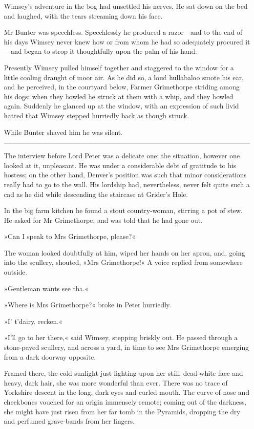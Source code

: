 Wimsey's adventure in the bog had unsettled his nerves. He sat down on the bed and laughed, with the tears streaming down his face.

Mr Bunter was speechless. Speechlessly he produced a razor—and to the end of his days Wimsey never knew how or from whom he had so adequately procured it—and began to strop it thoughtfully upon the palm of his hand.

Presently Wimsey pulled himself together and staggered to the window for a little cooling draught of moor air. As he did so, a loud hullabaloo smote his ear, and he perceived, in the courtyard below, Farmer Grimethorpe striding among his dogs; when they howled he struck at them with a whip, and they howled again. Suddenly he glanced up at the window, with an expression of such livid hatred that Wimsey stepped hurriedly back as though struck.

While Bunter shaved him he was silent. 

\noindent\hfil\rule{0.5\textwidth}{.4pt}\hfil 

The interview before Lord Peter was a delicate one; the situation, however one looked at it, unpleasant. He was under a considerable debt of gratitude to his hostess; on the other hand, Denver's position was such that minor considerations really had to go to the wall. His lordship had, nevertheless, never felt quite such a cad as he did while descending the staircase at Grider's Hole.

In the big farm kitchen he found a stout country-woman, stirring a pot of stew. He asked for Mr Grimethorpe, and was told that he had gone out.

»Can I speak to Mrs Grimethorpe, please?«

The woman looked doubtfully at him, wiped her hands on her apron, and, going into the scullery, shouted, »Mrs Grimethorpe!« A voice replied from somewhere outside.

»Gentleman wants see tha.«

»Where is Mrs Grimethorpe?« broke in Peter hurriedly.

»I' t'dairy, recken.«

»I'll go to her there,« said Wimsey, stepping briskly out. He passed through a stone-paved scullery, and across a yard, in time to see Mrs Grimethorpe emerging from a dark doorway opposite.

Framed there, the cold sunlight just lighting upon her still, dead-white face and heavy, dark hair, she was more wonderful than ever.  There was no trace of Yorkshire descent in the long, dark eyes and curled mouth. The curve of nose and cheekbones vouched for an origin immensely remote; coming out of the darkness, she might have just risen from her far tomb in the Pyramids, dropping the dry and perfumed grave-bands from her fingers.


